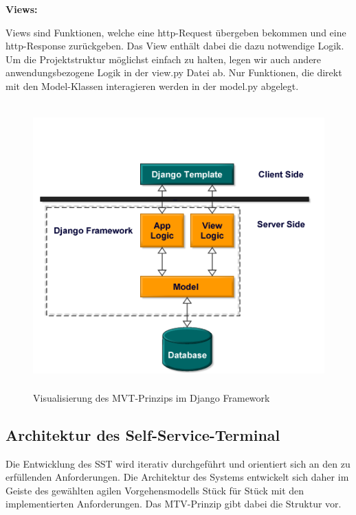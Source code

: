 \newpage

\noindent \textbf{Views:}\par
\vspace{0,5cm}
\noindent Views sind Funktionen, welche eine http-Request übergeben bekommen und eine http-Response zurückgeben. Das View enthält dabei die dazu notwendige Logik. Um die Projektstruktur möglichst einfach zu halten, legen wir auch andere anwendungsbezogene Logik in der view.py Datei ab. Nur Funktionen, die direkt mit den Model-Klassen interagieren werden in der model.py abgelegt.\par
\vspace{1cm}
\begin{figure}[htp]
    \centering
    \includegraphics[width=12cm , height=11cm]{Kapitel/Bilder/MVT-Erweitert-Diesmalwirklich.PNG}
    \caption{Visualisierung des MVT-Prinzips im Django Framework}
    \label{fig:MVT_Erweitert}
\end{figure}
\newpage
\subsection{Architektur des Self-Service-Terminal}
Die Entwicklung des SST wird iterativ durchgeführt und orientiert sich an den zu erfüllenden Anforderungen. Die Architektur des Systems entwickelt sich daher im Geiste des gewählten agilen Vorgehensmodells Stück für Stück mit den implementierten Anforderungen. Das MTV-Prinzip gibt dabei die Struktur vor. 


